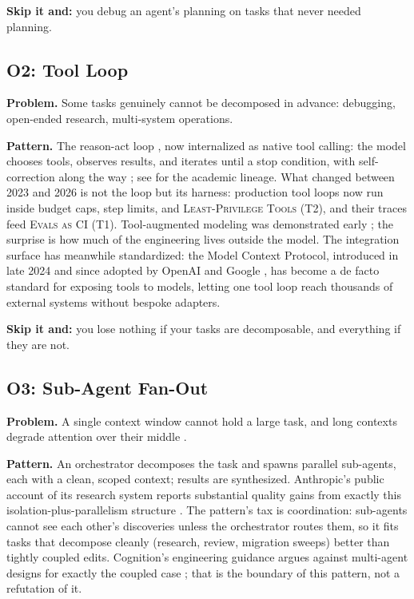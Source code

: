 \documentclass[11pt]{article}
\newcommand{\pat}[1]{\textsc{#1}}
\begin{document}
\textbf{Skip it and:} you debug an agent's planning on tasks that never needed
planning.

\subsection{O2: Tool Loop}

\textbf{Problem.} Some tasks genuinely cannot be decomposed in advance:
debugging, open-ended research, multi-system operations.

\textbf{Pattern.} The reason-act loop \citep{yao2023react}, now internalized
as native tool calling: the model chooses tools, observes results, and
iterates until a stop condition, with self-correction along the way
\citep{shinn2023reflexion, madaan2023selfrefine}; see
\citet{wang2024agentsurvey} for the academic lineage. What changed between 2023
and 2026 is not the loop but its harness: production tool loops now run
inside budget caps, step limits, and \pat{Least-Privilege Tools} (T2), and
their traces feed \pat{Evals as CI} (T1). Tool-augmented modeling was
demonstrated early \citep{schick2023toolformer}; the surprise is how much of
the engineering lives outside the model. The integration surface has
meanwhile standardized: the Model Context Protocol, introduced in late 2024
\citep{anthropic2024mcp} and since adopted by OpenAI and Google
\citep{techcrunch2025openaimcp, techcrunch2025googlemcp}, has become a de
facto standard for exposing tools to models, letting one tool loop reach
thousands of external systems without bespoke adapters.

\textbf{Skip it and:} you lose nothing if your tasks are decomposable, and
everything if they are not.

\subsection{O3: Sub-Agent Fan-Out}

\textbf{Problem.} A single context window cannot hold a large task, and long
contexts degrade attention over their middle \citep{liu2024lost}.

\textbf{Pattern.} An orchestrator decomposes the task and spawns parallel
sub-agents, each with a clean, scoped context; results are synthesized.
Anthropic's public account of its research system reports substantial quality
gains from exactly this isolation-plus-parallelism structure
\citep{anthropic2025multiagent}. The pattern's tax is coordination:
sub-agents cannot see each other's discoveries unless the orchestrator routes
them, so it fits tasks that decompose cleanly (research, review, migration
sweeps) better than tightly coupled edits. Cognition's engineering guidance
argues against multi-agent designs for exactly the coupled case
\citep{cognition2025dontbuild}; that is the boundary of this pattern, not a
refutation of it.
\end{document}
